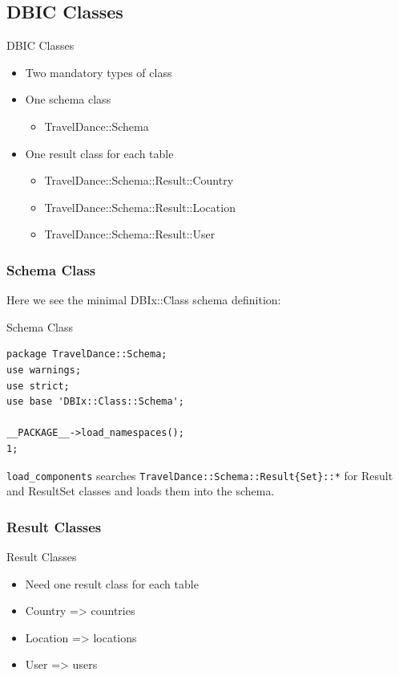 \subsection{DBIC Classes}

\begin{frame}{DBIC Classes}
\begin{itemize}
\item Two mandatory types of class
\item One schema class
\begin{itemize}
\item TravelDance::Schema
\end{itemize}
\item One result class for each table
\begin{itemize}
\item TravelDance::Schema::Result::Country
\item TravelDance::Schema::Result::Location
\item TravelDance::Schema::Result::User
\end{itemize}
\end{itemize}
\end{frame}

\subsubsection{Schema Class}

Here we see the minimal DBIx::Class schema definition:

\begin{frame}[fragile]{Schema Class}
\begin{lstlisting}
package TravelDance::Schema;
use warnings;
use strict;
use base 'DBIx::Class::Schema';

__PACKAGE__->load_namespaces();
1;
\end{lstlisting}
\end{frame}

\verb|load_components| searches \verb|TravelDance::Schema::Result{Set}::*|
for Result and ResultSet classes and loads them into the schema.

\subsubsection{Result Classes}

\begin{frame}{Result Classes}
\begin{itemize}
\item Need one result class for each table
\item Country => countries
\item Location => locations
\item User => users
\end{itemize}
\end{frame}

